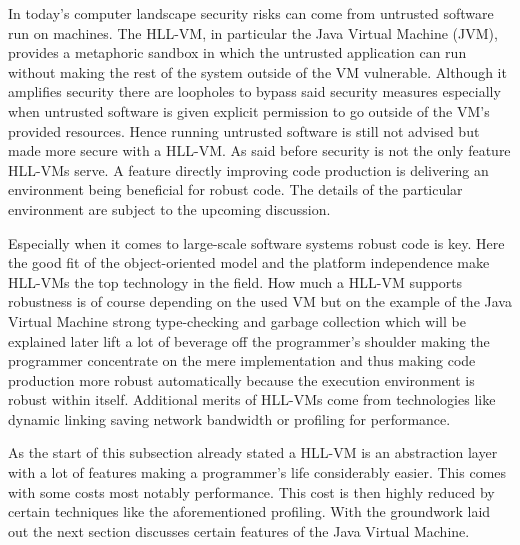 In today's computer landscape security risks can come from untrusted software run on machines. The HLL-VM, in particular the Java Virtual Machine (JVM),  provides a metaphoric sandbox in which the untrusted application can run without making the rest of the system outside of the VM vulnerable. Although it amplifies security there are loopholes to bypass said security measures especially when untrusted software is given explicit permission to go outside of the VM's provided resources. \cite{Smith, Lindholm} Hence running untrusted software is still not advised but made more secure with a HLL-VM. As said before security is not the only feature HLL-VMs serve. A feature directly improving code production is delivering an environment being beneficial for robust code. The details of the particular environment are subject to the upcoming discussion.

Especially when it comes to large-scale software systems robust code is key. Here the good fit of the object-oriented model and the platform independence make HLL-VMs the top technology in the field. How much a HLL-VM supports robustness is of course depending on the used VM but on the example of the Java Virtual Machine strong type-checking and garbage collection which will be explained later lift a lot of beverage off the programmer's shoulder making the programmer concentrate on the mere implementation and thus making code production more robust automatically because the execution environment is robust within itself. Additional merits of HLL-VMs come from technologies like dynamic linking saving network bandwidth or profiling for performance.\cite{Smith}

As the start of this subsection already stated a HLL-VM is an abstraction layer with a lot of features making a programmer's life considerably easier. This comes with some costs most notably performance. This cost is then highly reduced by certain techniques like the aforementioned profiling. With the groundwork laid out the next section discusses certain features of the Java Virtual Machine.

